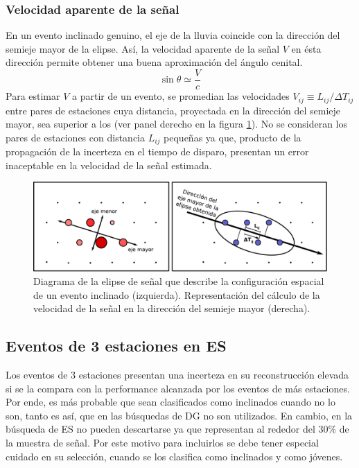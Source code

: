 		\subsubsection{Velocidad aparente de la señal}
		En un evento inclinado genuino, el eje de la lluvia coincide con la dirección del semieje mayor de la elipse.
		Así, la velocidad aparente de la señal $V$ en ésta dirección permite obtener una buena aproximación del ángulo cenital.
		\begin{equation}
		\sin\theta \simeq \frac{V}{c}
		\end{equation}
		Para estimar $V$ a partir de un evento, se promedian las velocidades $V_{ij}\equiv L_{ij}/\Delta T_{ij}$ entre pares de estaciones cuya distancia, proyectada en la dirección del semieje mayor, sea superior a los  (ver panel derecho en la figura \ref{fig:elipse}).
		No se consideran los pares de estaciones con distancia $L_{ij}$ pequeñas ya que, producto de la propagación de la incerteza en el tiempo de disparo, presentan un error inaceptable en la velocidad de la señal estimada.
		\begin{figure}[ht]
		\begin{center}
		\includegraphics[width=1.0\textwidth]{fig/seleccionAuger/elipse.pdf}
		\caption{Diagrama de la elipse de señal que describe la configuración espacial de un evento inclinado (izquierda). Representación del cálculo de la velocidad de la señal en la dirección del semieje mayor (derecha).}
		\label{fig:elipse}
		\end{center}
		\end{figure}
		
		\subsection{Eventos de 3 estaciones en ES}
		\label{sbsc:3StIncl}
		
		Los eventos de 3 estaciones presentan una incerteza en su reconstrucción elevada si se la compara con la performance alcanzada por los eventos de más estaciones. 
		Por ende, es más probable que sean clasificados como inclinados cuando no lo son, tanto es así, que en las búsquedas de DG no son utilizados.
		En cambio, en la búsqueda de ES no pueden descartarse ya que representan al rededor del 30$\%$ de la muestra de señal. 
		Por este motivo para incluirlos se debe tener especial cuidado en su selección, cuando se los clasifica como inclinados y como jóvenes.
		
